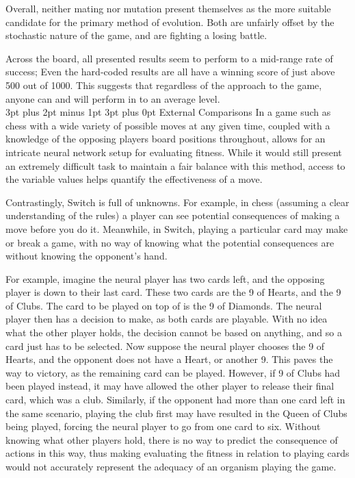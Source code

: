 \documentclass[12pt,a4paper]{article}
\makeatletter
\renewcommand\subsection{\@startsection {subsection}{1}{2mm} %
                               {3pt plus 2pt minus 1pt} %
                               {3pt plus 0pt} %
                               {\normalfont\bfseries}}
\makeatother
\begin{document}
Overall, neither mating nor mutation present themselves as the more suitable candidate for the primary method of evolution. Both are unfairly offset by the stochastic nature of the game, and are fighting a losing battle.

Across the board, all presented results seem to perform to a mid-range rate of success; Even the hard-coded results are all have a winning score of just above 500 out of 1000. This suggests that regardless of the approach to the game, anyone can and will perform in to an average level.\\

\subsection{External Comparisons}
In a game such as chess with a wide variety of possible moves at any given time, coupled with a knowledge of the opposing players board positions throughout, allows for an intricate neural network setup for evaluating fitness. While it would still present an extremely difficult task to maintain a fair balance with this method, access to the variable values helps quantify the effectiveness of a move.

Contrastingly, Switch is full of unknowns. For example, in chess (assuming a clear understanding of the rules) a player can see potential consequences of making a move before you do it. Meanwhile, in Switch, playing a particular card may make or break a game, with no way of knowing what the potential consequences are without knowing the opponent's hand. 

For example, imagine the neural player has two cards left, and the opposing player is down to their last card. These two cards are the 9 of Hearts, and the 9 of Clubs. The card to be played on top of is the 9 of Diamonds. The neural player then has a decision to make, as both cards are playable. With no idea what the other player holds, the decision cannot be based on anything, and so a card just has to be selected. Now suppose the neural player chooses the 9 of Hearts, and the opponent does not have a Heart, or another 9. This paves the way to victory, as the remaining card can be played. However, if 9 of Clubs had been played instead, it may have allowed the other player to release their final card, which was a club. Similarly, if the opponent had more than one card left in the same scenario, playing the club first may have resulted in the Queen of Clubs being played, forcing the neural player to go from one card to six. Without knowing what other players hold, there is no way to predict the consequence of actions in this way, thus making evaluating the fitness in relation to playing cards would not accurately represent the adequacy of an organism playing the game. 
\end{document}
